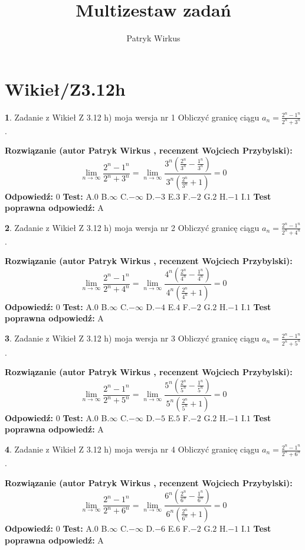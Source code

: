 \documentclass[12pt, a4paper]{article}
\title{Multizestaw zadań}
\author{Patryk Wirkus}
\date{}
\theoremstyle{definition} %
\newtheorem{zad}{}
\newcommand{\kategoria}[1]{\section{#1}}
\newcommand{\zadStart}[1]{\begin{zad}#1\newline}
\newcommand{\zadStop}{\end{zad}}
\newcommand{\rozwStart}[2]{\noindent \textbf{Rozwiązanie (autor #1 , recenzent #2): }\newline}
\newcommand{\rozwStop}{\newline}
\newcommand{\odpStart}{\noindent \textbf{Odpowiedź:}\newline}
\newcommand{\odpStop}{\newline}
\newcommand{\testStart}{\noindent \textbf{Test:}\newline}
\newcommand{\testStop}{\newline}
\newcommand{\kluczStart}{\noindent \textbf{Test poprawna odpowiedź:}\newline}
\newcommand{\kluczStop}{\newline}
\begin{document}
\maketitle

\kategoria{Wikieł/Z3.12h}


\zadStart{Zadanie z Wikieł Z 3.12 h) moja wersja nr 1}
Obliczyć granicę ciągu $a_{n}=\frac{2^{n} - 1^{n}}{2^{n} + 3^{n}}$.
\zadStop
\rozwStart{Patryk Wirkus}{Wojciech Przybylski}
$$\lim\limits_{n\to\infty}\frac{2^{n} - 1^{n}}{2^{n} + 3^{n}} = \lim\limits_{n\to\infty}\frac{3^{n}(\frac{2^{n}}{3^{n}} - \frac{1^{n}}{3^{n}})}{3^{n}(\frac{2^{n}}{3^{n}} + 1)} = 0$$
\rozwStop
\odpStart
$0$
\odpStop
\testStart
A.$0$
B.$\infty$
C.$-\infty$
D.$-3$
E.$3$
F.$-2$
G.$2$
H.$-1$
I.$1$
\testStop
\kluczStart
A
\kluczStop



\zadStart{Zadanie z Wikieł Z 3.12 h) moja wersja nr 2}
Obliczyć granicę ciągu $a_{n}=\frac{2^{n} - 1^{n}}{2^{n} + 4^{n}}$.
\zadStop
\rozwStart{Patryk Wirkus}{Wojciech Przybylski}
$$\lim\limits_{n\to\infty}\frac{2^{n} - 1^{n}}{2^{n} + 4^{n}} = \lim\limits_{n\to\infty}\frac{4^{n}(\frac{2^{n}}{4^{n}} - \frac{1^{n}}{4^{n}})}{4^{n}(\frac{2^{n}}{4^{n}} + 1)} = 0$$
\rozwStop
\odpStart
$0$
\odpStop
\testStart
A.$0$
B.$\infty$
C.$-\infty$
D.$-4$
E.$4$
F.$-2$
G.$2$
H.$-1$
I.$1$
\testStop
\kluczStart
A
\kluczStop



\zadStart{Zadanie z Wikieł Z 3.12 h) moja wersja nr 3}
Obliczyć granicę ciągu $a_{n}=\frac{2^{n} - 1^{n}}{2^{n} + 5^{n}}$.
\zadStop
\rozwStart{Patryk Wirkus}{Wojciech Przybylski}
$$\lim\limits_{n\to\infty}\frac{2^{n} - 1^{n}}{2^{n} + 5^{n}} = \lim\limits_{n\to\infty}\frac{5^{n}(\frac{2^{n}}{5^{n}} - \frac{1^{n}}{5^{n}})}{5^{n}(\frac{2^{n}}{5^{n}} + 1)} = 0$$
\rozwStop
\odpStart
$0$
\odpStop
\testStart
A.$0$
B.$\infty$
C.$-\infty$
D.$-5$
E.$5$
F.$-2$
G.$2$
H.$-1$
I.$1$
\testStop
\kluczStart
A
\kluczStop



\zadStart{Zadanie z Wikieł Z 3.12 h) moja wersja nr 4}
Obliczyć granicę ciągu $a_{n}=\frac{2^{n} - 1^{n}}{2^{n} + 6^{n}}$.
\zadStop
\rozwStart{Patryk Wirkus}{Wojciech Przybylski}
$$\lim\limits_{n\to\infty}\frac{2^{n} - 1^{n}}{2^{n} + 6^{n}} = \lim\limits_{n\to\infty}\frac{6^{n}(\frac{2^{n}}{6^{n}} - \frac{1^{n}}{6^{n}})}{6^{n}(\frac{2^{n}}{6^{n}} + 1)} = 0$$
\rozwStop
\odpStart
$0$
\odpStop
\testStart
A.$0$
B.$\infty$
C.$-\infty$
D.$-6$
E.$6$
F.$-2$
G.$2$
H.$-1$
I.$1$
\testStop
\kluczStart
A
\kluczStop
\end{document}
